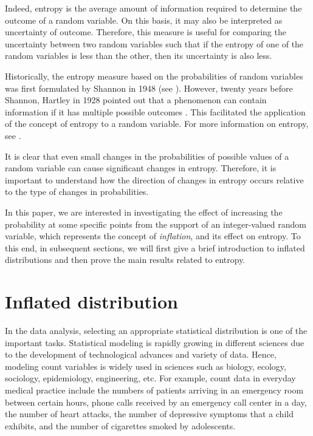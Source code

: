 \documentclass[twoside]{article}
\begin{document}
Indeed, entropy is the average amount of information required to determine the outcome of a random variable. On this basis, it may also be interpreted as uncertainty of outcome. Therefore,
this measure is useful for comparing the uncertainty between two random variables such that if the entropy of one of the random variables is less than the other, then its uncertainty is also less. 


Historically, the entropy measure based on the probabilities of random variables was first formulated by Shannon in 1948 (see \cite{Shannon}). However, twenty years before Shannon, Hartley in 1928 pointed out that a phenomenon can contain information if it has multiple possible outcomes \cite{Hartley}. This facilitated the application of the concept of entropy to a random variable. For more information on entropy, see \cite{Brookes}.

It is clear that even small changes in the probabilities of possible values ​​of a random variable can cause significant changes in entropy.
Therefore, it is important to understand how the direction of changes in entropy occurs relative to the type of changes in probabilities.

In this paper, we are interested in investigating the effect of increasing the probability at some specific points from the support of an integer-valued random variable, which represents the concept of \textit{inflation}, and its effect on entropy. To this end, in subsequent sections, we will first give a brief introduction to inflated distributions and then prove the main results related to entropy.

\section{Inflated distribution}
In the data analysis, selecting an appropriate statistical distribution is one of the important tasks. Statistical modeling is rapidly growing in  different sciences due to the development of technological advances and variety of data. 
Hence, modeling count variables is widely used in sciences such as biology, ecology, sociology, epidemiology, engineering, etc. 
For example, count data in everyday medical practice include the numbers of patients arriving in an emergency room between certain hours, phone calls received by an emergency call center in a day, the number of heart attacks, the number of depressive symptoms that a child exhibits, and the number of cigarettes smoked by adolescents. 
\end{document}
